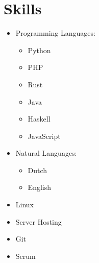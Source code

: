 \documentclass[a4paper,12pt]{article}
\begin{document}
\section{Skills}
\begin{multicols}{2}
\begin{itemize}
    \item Programming Languages:
        \begin{itemize}
            \item Python
            \item PHP
            \item Rust
            \item Java
            \item Haskell
            \item JavaScript
        \end{itemize}
    \item Natural Languages:
        \begin{itemize}
            \item Dutch
            \item English
        \end{itemize}
    \item Linux
    \item Server Hosting
    \item Git
    \item Scrum
\end{itemize}
\end{multicols}

\vfill
{}
\end{document}
